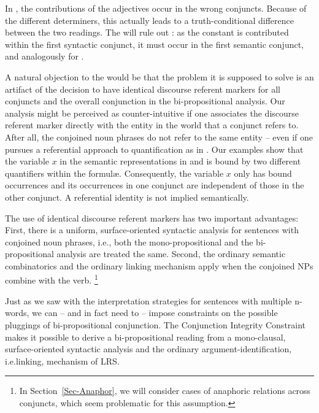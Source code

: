 \documentclass[output=paper]{langsci/langscibook}
\begin{document}
In , the contributions of the adjectives occur in the wrong conjuncts.
Because of the different determiners, this actually leads to a truth-conditional difference between the two readings. The \CCB{} will rule out : as the constant  is contributed within the first syntactic conjunct, it must occur in the first semantic conjunct, and analogously for .

\medskip%
A natural objection to the \CCB{} would be that the problem it is supposed to solve is an artifact of the decision to have identical discourse referent markers for all conjuncts and the overall conjunction in the bi-propositional analysis. 
Our analysis might be perceived as counter-intuitive if one associates the discourse referent marker directly with the entity in the world that a conjunct refers to. After all, the conjoined noun phrases do not refer to the same entity -- even if one pursues a referential approach to quantification as in \citet{Luecking:Ginzburg:19}.
Our examples show that the variable $x$ in the semantic representations in  and  is bound by two different quantifiers within the formul\ae. 
Consequently, the variable $x$ only has bound occurrences and its occurrences in one conjunct are independent of those in the other conjunct. 
A referential identity is not implied semantically. 

The use of identical discourse referent markers has two important advantages: 
First, there is a uniform, surface-oriented syntactic analysis for sentences with conjoined noun phrases, i.e., both the mono-propositional and the bi-pro\-po\-si\-tional analysis are treated the same. 
Second, the ordinary semantic combinatorics and the ordinary linking mechanism apply when the conjoined NPs combine with the verb.%
\footnote{In Section~\ref{Sec-Anaphor}, we will consider cases of anaphoric relations across conjuncts, which seem problematic for this assumption.}

\bigskip%
Just as we saw with the interpretation strategies for sentences with multiple n-words, we can -- and in fact need to -- impose constraints on the possible pluggings of bi-propositional conjunction. 
The Conjunction Integrity Constraint
makes it possible to derive a bi-propositional reading from a mono-clausal, surface-oriented syntactic analysis and the ordinary argument-identification, i.e.\@ linking, mechanism of LRS.
\end{document}
